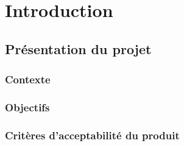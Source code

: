 
\newcommand{\titre}{{\Huge Dossier de conception}\\Groupe B}
\newcommand{\titrehead}{Dossier de conception}

%


\maketitle
\tableofcontents



\chapter{Introduction}


\section{Présentation du projet}
        \paragraph*{}

\subsection{Contexte}
        \paragraph*{}

\subsection{Objectifs}
        \paragraph*{}

\subsection{Critères d'acceptabilité du produit}
        \paragraph*{}


